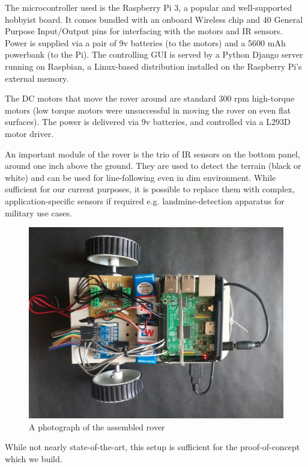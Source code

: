 \begin{description}[font=\quad $\circ$, topsep=-2pt, itemsep=2pt]
	\item The microcontroller used is the Raspberry Pi 3, a popular and well-supported hobbyist board. It comes bundled with an onboard Wireless chip and 40 General Purpose Input/Output pins for interfacing with the motors and IR sensors. Power is supplied via a pair of 9v batteries (to the motors) and a 5600 mAh powerbank (to the Pi). The controlling GUI is served by a Python Django server running on Raspbian, a Linux-based distribution installed on the Raspberry Pi’s external memory.

	\item The DC motors that move the rover around are standard 300 rpm high-torque motors \cite{300RPMMotors} (low torque motors were unsuccessful in moving the rover on even flat surfaces). The power is delivered via 9v batteries, and controlled via a L293D motor driver. 


	\item An important module of the rover is the trio of IR sensors on the bottom panel, around one inch above the ground. They are used to detect the terrain (black or white) and can be used for line-following even in dim environment. While sufficient for our current purposes, it is possible to replace them with complex, application-specific sensors if required e.g. landmine-detection apparatus for military use cases. \\

	\begin{figure}[ht]	%
		\centering
		\includegraphics[width=\linewidth]{"./bot-pic-top.jpg"}
		\caption{A photograph of the assembled rover}
		\label{fig:BotPicTop}
	\end{figure}
	
\end{description}

While not nearly state-of-the-art, this setup is sufficient for the proof-of-concept which we build.

